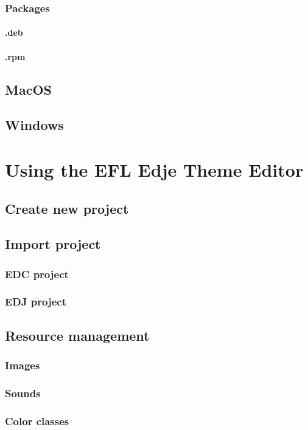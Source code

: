 \documentclass[titlepage,oneside,11pt]{book}
\begin{document}
\subsection{Packages}
\subsubsection{.deb}
\subsubsection{.rpm}
\newpage
\section{MacOS}
\newpage
\section{Windows}
\chapter{Using the EFL Edje Theme Editor}
\section{Create new project}
\section{Import project}
\subsection{EDC project}
\subsection{EDJ project}
\section{Resource management}
\subsection{Images}
\subsection{Sounds}
\subsection{Color classes}
\end{document}
